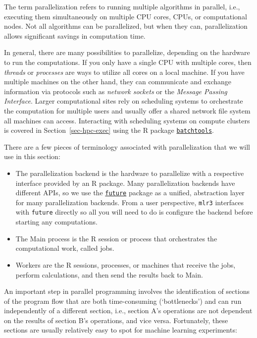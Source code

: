 The term parallelization refers to running
multiple algorithms in parallel, i.e., executing them simultaneously on
multiple CPU cores, CPUs, or computational nodes. Not all algorithms can
be parallelized, but when they can, parallelization allows significant
savings in computation time.

In general, there are many possibilities to parallelize, depending on
the hardware to run the computations. If you only have a single CPU with
multiple cores, then \emph{threads} or \emph{processes} are ways to
utilize all cores on a local machine. If you have multiple machines on
the other hand, they can communicate and exchange information via
protocols such as \emph{network sockets} or the \emph{Message Passing
Interface}. Larger computational sites rely on scheduling systems to
orchestrate the computation for multiple users and usually offer a
shared network file system all machines can access. Interacting with
scheduling systems on compute clusters is covered in
Section~\ref{sec-hpc-exec} using the R package
\href{https://cran.r-project.org/package=batchtools}{\texttt{batchtools}}.

There are a few pieces of terminology associated with parallelization
that we will use in this section:

\begin{itemize}
\tightlist
\item
  The parallelization
  backend is the hardware to parallelize with a
  respective interface provided by an R package. Many parallelization
  backends have different APIs, so we use the
  \href{https://cran.r-project.org/package=future}{\texttt{future}}
  package as a unified, abstraction layer for many parallelization
  backends. From a user perspective, \texttt{mlr3} interfaces with
  \texttt{future} directly so all you will need to do is configure the
  backend before starting any computations.
\item
  The Main process is the R session or process that orchestrates the
  computational work, called jobs.
\item
  Workers are the R sessions, processes, or machines that receive the
  jobs, perform calculations, and then send the results back to Main.
\end{itemize}

An important step in parallel programming involves the identification of
sections of the program flow that are both time-consuming
(`bottlenecks') and can run independently of a different section, i.e.,
section A's operations are not dependent on the results of section B's
operations, and vice versa. Fortunately, these sections are usually
relatively easy to spot for machine learning experiments:

